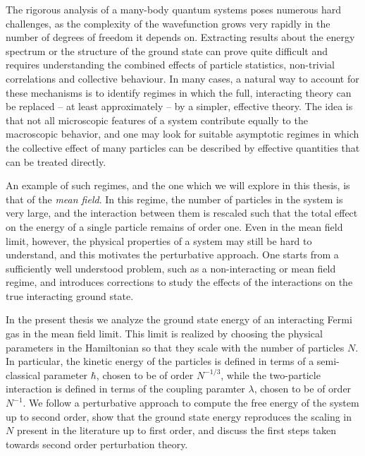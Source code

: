 \documentclass[12pt]{article}
\begin{document}
The rigorous analysis of a many-body quantum systems poses numerous hard challenges, as the
complexity of the wavefunction grows very rapidly in the number of degrees of freedom it
depends on. Extracting results about the energy spectrum or the structure of the ground state
can prove quite difficult and requires understanding the combined effects of particle
statistics, non-trivial correlations and collective behaviour.
In many cases, a natural way to account for these mechanisms is to identify regimes in which
the full, interacting theory can be replaced -- at least approximately -- by a simpler,
effective theory. The idea is that not all microscopic features of a system contribute equally
to the macroscopic behavior, and one may look for suitable asymptotic regimes in which
the collective effect of many particles can be described by effective quantities that can
be treated directly.

An example of such regimes, and the one which we will explore in this thesis, is that of the
\textit{mean field}. In this regime, the number of particles in the system is
very large, and the interaction between them is rescaled such that the total effect on the
energy of a single particle remains of order one. Even in the mean field limit, however, the
physical properties of a system may still be hard to understand, and this motivates the
perturbative approach. One starts from a sufficiently well understood problem, such as a
non-interacting or mean field regime, and introduces corrections to study the effects of the
interactions on the true interacting ground state.

In the present thesis we analyze the ground state energy of an interacting
Fermi gas in the mean field limit. This limit is realized by choosing the physical parameters
in the Hamiltonian so that they scale with the number of particles $N$. In particular, the
kinetic energy of the particles is defined in terms of a semi-classical parameter $\hbar$,
chosen to be of order $N^{-1/3}$, while the two-particle interaction is defined in terms of
the coupling paramter $\lambda$, chosen to be of order $N^{-1}$.
We follow a perturbative approach to compute the free energy of the system up to second order,
show that the ground state energy reproduces the scaling in $N$ present in the literature
up to first order, and discuss the first steps taken towards second order perturbation theory.
\end{document}
